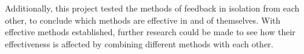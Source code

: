Additionally, this project tested the methods of feedback in isolation from each other, to conclude which methods are effective in and of themselves. With effective methods established, further research could be made to see how their effectiveness is affected by combining different methods with each other.